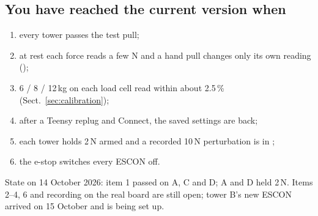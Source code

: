 \subsection{You have reached the current version when}
\begin{enumerate}
\item every tower passes the test pull;
\item at rest each force reads a few N and a hand pull changes only its own reading
();
\item 6 / 8 / 12\,kg on each load cell read within about 2.5\,\% (Sect.~\ref{sec:calibration});
\item after a Teensy replug and Connect, the saved settings are back;
\item each tower holds 2\,N armed and a recorded 10\,N perturbation is in ;
\item the e-stop switches every ESCON off.
\end{enumerate}
State on 14 October 2026: item 1 passed on A, C and D; A and D held 2\,N. Items 2--4, 6 and recording on the
real board are still open; tower B's new ESCON arrived on 15 October and is being set up.
